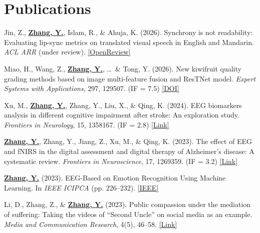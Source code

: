 \documentclass[letterpaper,11pt]{article}
\begin{document}
\section{Publications}
\vspace{-4pt}
\begin{itemize}[leftmargin=0.3in, label={}, itemsep=1pt, parsep=0pt, topsep=1pt]
  \footnotesize{

    \item [1] Jin, Z., \textbf{\underline{Zhang, Y.}}, Islam, R., \& Ahuja, K. (2026). Synchrony is not readability: Evaluating lip-sync metrics on translated visual speech in English and Mandarin. \textit{ACL ARR} (under review). \href{https://openreview.net/forum?id=CW7dhFQOSA}{\underline{[OpenReview]}}

    \item [2] Miao, H., Wang, Z., \textbf{\underline{Zhang, Y.}}, \ldots\ \& Tong, Y. (2026). New kiwifruit quality grading methods based on image multi-feature fusion and ResTNet model. \textit{Expert Systems with Applications}, 297, 129507. (IF = 7.5) \href{https://doi.org/10.1016/j.eswa.2025.129507}{\underline{[DOI]}}

    \item [3] Xu, M., \textbf{\underline{Zhang, Y.}}, Zhang, Y., Liu, X., \& Qing, K. (2024). EEG biomarkers analysis in different cognitive impairment after stroke: An exploration study. \textit{Frontiers in Neurology}, 15, 1358167. (IF = 2.8) \href{https://www.frontiersin.org/journals/neurology/articles/10.3389/fneur.2024.1358167/full}{\underline{[Link]}}

    \item [4] \textbf{\underline{Zhang, Y.}}, Zhang, Y., Jiang, Z., Xu, M., \& Qing, K. (2023). The effect of EEG and fNIRS in the digital assessment and digital therapy of Alzheimer’s disease: A systematic review. \textit{Frontiers in Neuroscience}, 17, 1269359. (IF = 3.2) \href{https://www.frontiersin.org/journals/neuroscience/articles/10.3389/fnins.2023.1269359/full}{\underline{[Link]}}

    \item [5] \textbf{\underline{Zhang, Y.}} (2023). EEG-Based on Emotion Recognition Using Machine Learning. In \textit{IEEE ICIPCA} (pp. 226–232). \href{https://ieeexplore.ieee.org/abstract/document/10257784}{\underline{[IEEE]}}

    \item [6] Li, D., Zhang, Z., \& \textbf{\underline{Zhang, Y.}} (2023). Public compassion under the mediation of suffering: Taking the videos of ``Second Uncle'' on social media as an example. \textit{Media and Communication Research}, 4(5), 46–58. \href{https://clausiuspress.com/article/8423.html}{\underline{[Link]}}
  }
\end{itemize}
\vspace{-5pt}
\end{document}
